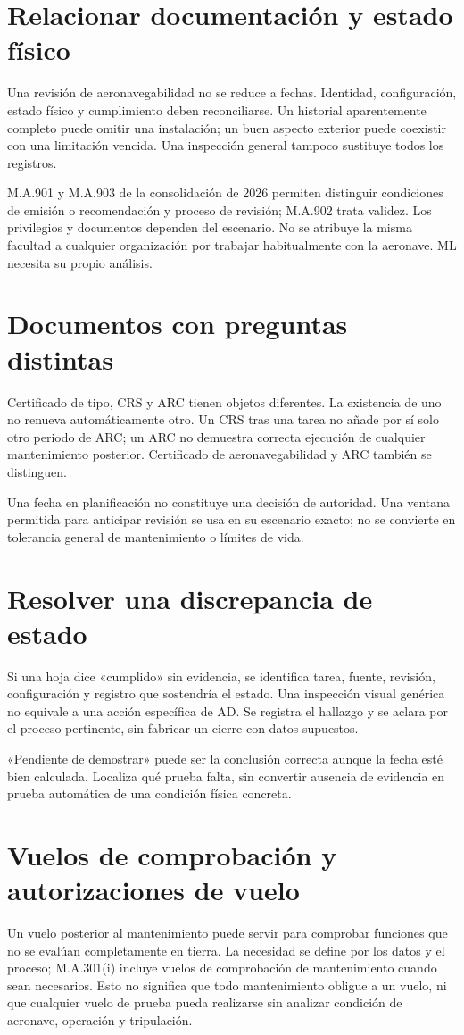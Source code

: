 
\section{Relacionar documentación y estado físico}
Una revisión de aeronavegabilidad no se reduce a fechas. Identidad, configuración, estado físico y cumplimiento deben reconciliarse. Un historial aparentemente completo puede omitir una instalación; un buen aspecto exterior puede coexistir con una limitación vencida. Una inspección general tampoco sustituye todos los registros.

M.A.901 y M.A.903 de la consolidación de 2026 permiten distinguir condiciones de emisión o recomendación y proceso de revisión; M.A.902 trata validez. Los privilegios y documentos dependen del escenario. No se atribuye la misma facultad a cualquier organización por trabajar habitualmente con la aeronave. ML necesita su propio análisis.
\section{Documentos con preguntas distintas}
Certificado de tipo, CRS y ARC tienen objetos diferentes. La existencia de uno no renueva automáticamente otro. Un CRS tras una tarea no añade por sí solo otro periodo de ARC; un ARC no demuestra correcta ejecución de cualquier mantenimiento posterior. Certificado de aeronavegabilidad y ARC también se distinguen.

Una fecha en planificación no constituye una decisión de autoridad. Una ventana permitida para anticipar revisión se usa en su escenario exacto; no se convierte en tolerancia general de mantenimiento o límites de vida.
\section{Resolver una discrepancia de estado}
Si una hoja dice «cumplido» sin evidencia, se identifica tarea, fuente, revisión, configuración y registro que sostendría el estado. Una inspección visual genérica no equivale a una acción específica de AD. Se registra el hallazgo y se aclara por el proceso pertinente, sin fabricar un cierre con datos supuestos.

«Pendiente de demostrar» puede ser la conclusión correcta aunque la fecha esté bien calculada. Localiza qué prueba falta, sin convertir ausencia de evidencia en prueba automática de una condición física concreta.

\Needspace{.75\textheight}
\section{Vuelos de comprobación y autorizaciones de vuelo}
Un vuelo posterior al mantenimiento puede servir para comprobar funciones que no se evalúan completamente en tierra. La necesidad se define por los datos y el proceso; M.A.301(i) incluye vuelos de comprobación de mantenimiento cuando sean necesarios. Esto no significa que todo mantenimiento obligue a un vuelo, ni que cualquier vuelo de prueba pueda realizarse sin analizar condición de aeronave, operación y tripulación.

